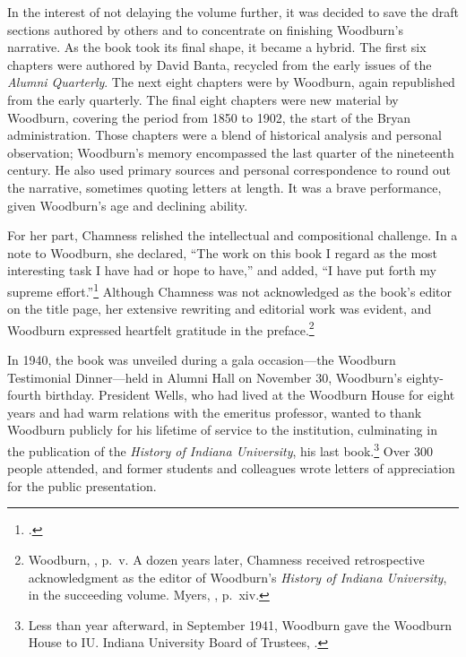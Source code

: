 \documentclass[
  american,
  letterpaper,
]{scrreprt}
\begin{document}
In the interest of not delaying the volume further, it was decided to
save the draft sections authored by others and to concentrate on
finishing Woodburn's narrative. As the book took its final shape, it
became a hybrid. The first six chapters were authored by David Banta,
recycled from the early issues of the \emph{Alumni Quarterly}. The next
eight chapters were by Woodburn, again republished from the early
quarterly. The final eight chapters were new material by Woodburn,
covering the period from 1850 to 1902, the start of the Bryan
administration. Those chapters were a blend of historical analysis and
personal observation; Woodburn's memory encompassed the last quarter of
the nineteenth century. He also used primary sources and personal
correspondence to round out the narrative, sometimes quoting letters at
length. It was a brave performance, given Woodburn's age and declining
ability.

For her part, Chamness relished the intellectual and compositional
challenge. In a note to Woodburn, she declared, ``The work on this book
I regard as the most interesting task I have had or hope to have,'' and
added, ``I have put forth my supreme effort.''\footnote{.} Although
Chamness was not acknowledged as the book's editor on the title page,
her extensive rewriting and editorial work was evident, and Woodburn
expressed heartfelt gratitude in the preface.\footnote{Woodburn,
  , p.~v. A dozen years later, Chamness received retrospective
  acknowledgment as the editor of Woodburn's \emph{History of Indiana
  University}, in the succeeding volume. Myers,
  ,
  p.~xiv.}

In 1940, the book was unveiled during a gala occasion---the Woodburn
Testimonial Dinner---held in Alumni Hall on November 30, Woodburn's
eighty-fourth birthday. President Wells, who had lived at the Woodburn
House for eight years and had warm relations with the emeritus
professor, wanted to thank Woodburn publicly for his lifetime of service
to the institution, culminating in the publication of the \emph{History
of Indiana University}, his last book.\footnote{Less than year
  afterward, in September 1941, Woodburn gave the Woodburn House to IU.
  Indiana University Board of Trustees,
  .}
Over 300 people attended, and former students and colleagues wrote
letters of appreciation for the public presentation.
\end{document}
